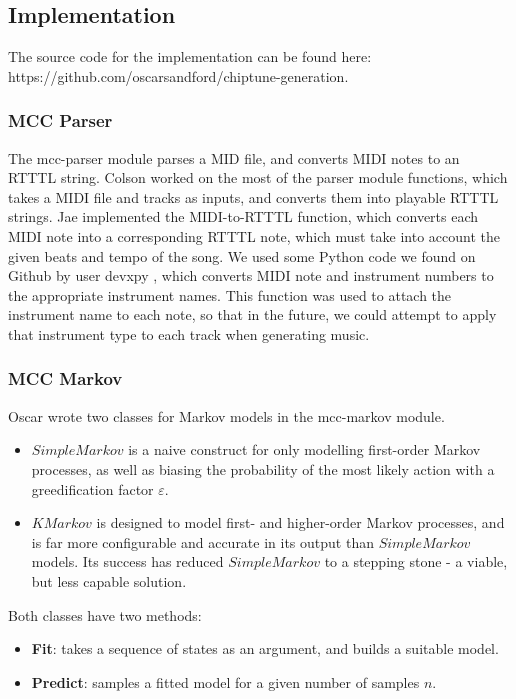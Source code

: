 \documentclass{article}
\begin{document}
\subsection{Implementation}
The source code for the implementation can be found here: https://github.com/oscarsandford/chiptune-generation.

\subsubsection{MCC Parser}
The mcc-parser module parses a MID file, and converts MIDI notes to an RTTTL string. Colson worked on the most of the parser module functions, which takes a MIDI file and 
tracks as inputs, and converts them into playable RTTTL strings. Jae implemented the MIDI-to-RTTTL function, which converts each MIDI note into a corresponding RTTTL note, 
which must take into account the given beats and tempo of the song. We used some Python code we found on Github by user devxpy \cite{midi_instruments}, which converts MIDI 
note and instrument numbers to the appropriate instrument names. This function was used to attach the instrument name to each note, so that in the future, we could attempt 
to apply that instrument type to each track when generating music. 

\subsubsection{MCC Markov}
Oscar wrote two classes for Markov models in the mcc-markov module.
\begin{itemize}
  \item $SimpleMarkov$ is a naive construct for only modelling first-order Markov processes, as well as biasing the probability of the most likely action with a 
  greedification factor $\varepsilon$. 
  \item $KMarkov$ is designed to model first- and higher-order Markov processes, and is far more configurable and accurate in its output than $SimpleMarkov$ models. 
  Its success has reduced $SimpleMarkov$ to a stepping stone - a viable, but less capable solution.
\end{itemize}

Both classes have two methods: 
\begin{itemize}
  \item \textbf{Fit}: takes a sequence of states as an argument, and builds a suitable model.
  \item \textbf{Predict}: samples a fitted model for a given number of samples $n$.
\end{itemize}
\end{document}
